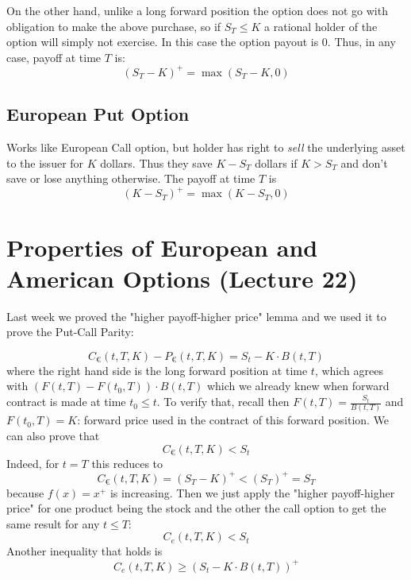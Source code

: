 \documentclass[oneside]{book}
\begin{document}
On the other hand, unlike a long forward position the option does not go with
obligation to make the above purchase, so if $S_T \leq K$ a rational holder
of the option will simply not exercise. In this case the option payout is $0$.
Thus, in any case, payoff at time $T$ is:
$$
(S_T-K)^+ = \max(S_T-K, 0)
$$
\subsection{European Put Option}
Works like European Call option, but holder has right to \textit{sell} the underlying
asset to the issuer for $K$ dollars. Thus they save $K-S_T$ dollars if $K>S_T$ and don't
save or lose anything otherwise. The payoff at time $T$ is
$$
(K-S_T)^+ = \max(K-S_T, 0)
$$

\section{Properties of European and American Options (Lecture 22)}
Last week we proved the "higher payoff-higher price" lemma and we used it to prove
 the Put-Call Parity:

 $$
 C_\euro(t, T, K) - P_\euro(t, T, K)  = S_t - K \cdot B(t,T)
 $$
 where the right hand side is the long forward position at time $t$, which agrees with
 $(F(t,T) -F(t_0, T)) \cdot B(t,T)$ which we already knew when forward contract is made
 at time $t_0 \leq t$. To verify that, recall then $F(t,T) = \frac{S_t}{B(t,T)}$ and
 $F(t_0, T) = K$: forward price used in the contract of this forward position.
 We can also prove that
 $$
    C_\euro(t,T,K) < S_t
 $$
 Indeed, for $t=T$ this reduces to
 $$
    C_\euro(t,T,K) = (S_T - K)^+ < (S_T)^+ = S_T
 $$
 because $f(x) = x^+$ is increasing.
 Then we just apply the "higher payoff-higher price" for one product being the
 stock and the other the call option to get the same result for any $t \leq T$:
 $$
 C_e(t,T,K) < S_t
 $$
 Another inequality that holds is
 $$
 C_e(t,T,K) \geq (S_t - K\cdot B(t,T))^+
 $$
\end{document}
